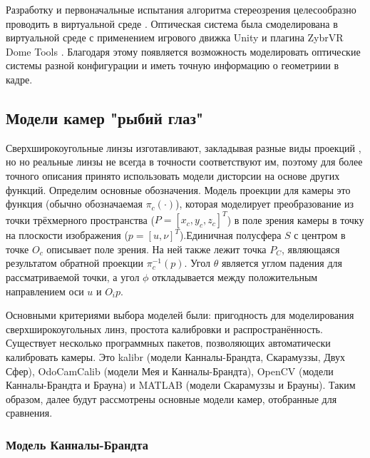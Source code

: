 Разработку и первоначальные испытания алгоритма стереозрения целесообразно проводить в виртуальной среде \cite{simulations}. Оптическая система была смоделирована 
в виртуальной среде с применением игрового движка Unity и плагина ZybrVR Dome Tools \cite{dome_tools}. Благодаря этому появляется возможность моделировать  %
оптические системы разной конфигурации и иметь точную информацию о геометриии в кадре. 

\subsection{Модели камер "рыбий глаз"}

Сверхширокоугольные линзы изготавливают, закладывая разные виды проекций \cite{projections}, но 
но реальные линзы не всегда в точности соответствуют им, поэтому для более точного описания принято использовать модели дисторсии
 на основе других функций.
Определим основные обозначения. Модель проекции для камеры это функция (обычно обозначаемая $\pi_c(\cdot )$), которая моделирует преобразование 
из точки трёхмерного пространства ($P=[x_c, y_c, z_c]^T$) в поле зрения камеры в точку на плоскости изображения ($p=[u, \nu]^T$).Единичная            %
полусфера $S$ с центром в точке $O_c$ описывает поле зрения. На ней также лежит точка $P_C$, являющаяся результатом обратной проекции $\pi^{-1}_c({p})$.
Угол $\theta$ является углом падения для рассматриваемой точки, а угол $\phi$ откладывается между положительным направлением оси $u$ и $O_{i}{p}$. 

Основными критериями выбора моделей были: пригодность для моделирования 
сверхширокоугольных линз, простота калибровки и распространённость. Существует несколько программных пакетов, позволяющих автоматически калибровать камеры. 
Это kalibr (модели Канналы-Брандта, Скарамуззы, Двух Сфер), OdoCamCalib (модели Мея и Канналы-Брандта), OpenCV (модели Канналы-Брандта и Брауна) и MATLAB 
(модели Скарамуззы и Брауны). Таким образом, далее будут рассмотрены основные модели камер, отобранные для сравнения. 

\subsubsection{Модель Канналы-Брандта}


